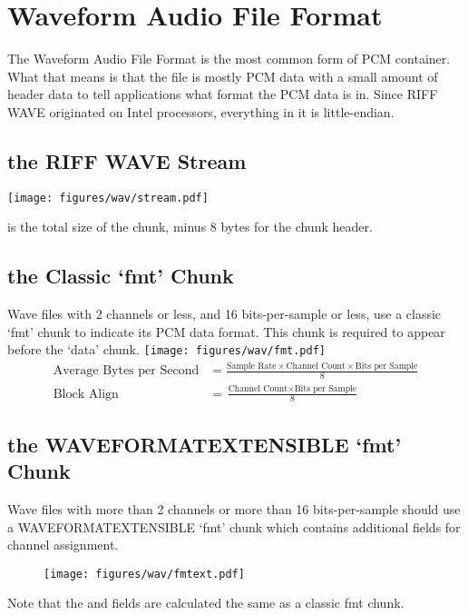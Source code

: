 
\chapter{Waveform Audio File Format}
The Waveform Audio File Format is the most common form of PCM container.
What that means is that the file is mostly PCM data with a
small amount of header data to tell applications what format the
PCM data is in.
Since RIFF WAVE originated on Intel processors, everything in it
is little-endian.
\section{the RIFF WAVE Stream}
\texttt{[image: figures/wav/stream.pdf]}
\par
\noindent
{} is the total size of the chunk, minus
8 bytes for the chunk header.
\section{the Classic `fmt' Chunk}
Wave files with 2 channels or less, and 16 bits-per-sample or less,
use a classic `fmt' chunk to indicate its PCM data format.
This chunk is required to appear before the `data' chunk.
\texttt{[image: figures/wav/fmt.pdf]}
\begin{align}
\text{Average Bytes per Second} &= \frac{\text{Sample Rate}
  \times \text{Channel Count} \times \text{Bits per Sample}}{8} \\
\text{Block Align} &= \frac{\text{Channel Count} \times \text{Bits per Sample}}{8}
\end{align}
\section{the WAVEFORMATEXTENSIBLE `fmt' Chunk}
Wave files with more than 2 channels or more than 16 bits-per-sample
should use a WAVEFORMATEXTENSIBLE `fmt' chunk which contains
additional fields for channel assignment.
\begin{figure}[h]
\texttt{[image: figures/wav/fmtext.pdf]}
\end{figure}
\par
\noindent
Note that the  and  fields
are calculated the same as a classic fmt chunk.

